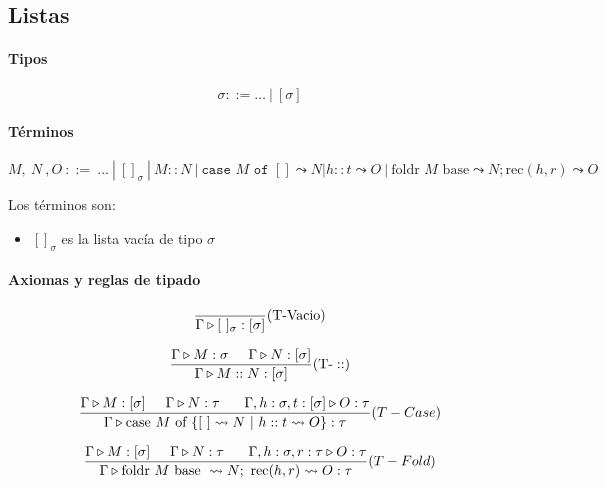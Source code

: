 \subsection{Listas}

\paragraph{Tipos}
$$\sigma::= \dots~|~[\sigma]$$

\paragraph{Términos}
$$M,~N~,O~::=~\dots~|~[]_{\sigma}~|~M::N~|~\texttt{case } M \texttt{ of } {[] \leadsto N | h::t \leadsto O}~|~\text{foldr } M \text{ base} \leadsto N; \text{rec}(h,r)\leadsto O$$	

Los términos son:
\begin{itemize}
	\item $[]_{\sigma}$ es la lista vacía de tipo $\sigma$
\end{itemize}
\paragraph{Axiomas y reglas de tipado}
\begin{multicols}{2}
	$$\frac{}{\Gamma\triangleright [~]_{\sigma} : [\sigma]}(\text{T-Vacio})$$
	
	\vspace*{5mm}
	$$\frac{\Gamma\triangleright M : \sigma\hspace*{5mm}\Gamma\triangleright N : [\sigma]}{\Gamma\triangleright M::N : [\sigma]}(\text{T-}::)$$
	
	\vspace*{5mm}
	$$\frac{\Gamma\triangleright M : [\sigma]\hspace*{5mm}\Gamma\triangleright N : \tau~\hspace*{5mm}\Gamma,h:\sigma,t:[\sigma]\triangleright O : \tau}{\Gamma\triangleright \text{case } M \text{ of } \{[~]\leadsto N~|~h::t\leadsto O\} : \tau}(T-Case)$$
	
	\vspace*{5mm}
	$$\frac{\Gamma\triangleright M : [\sigma]\hspace*{5mm}\Gamma\triangleright N : \tau~\hspace*{5mm}\Gamma,h:\sigma,r:\tau\triangleright O : \tau}{\Gamma\triangleright \text{foldr } M \text{ base }\leadsto N;~\text{rec}(h, r)\leadsto O : \tau}(T-Fold)$$
	
\end{multicols}

